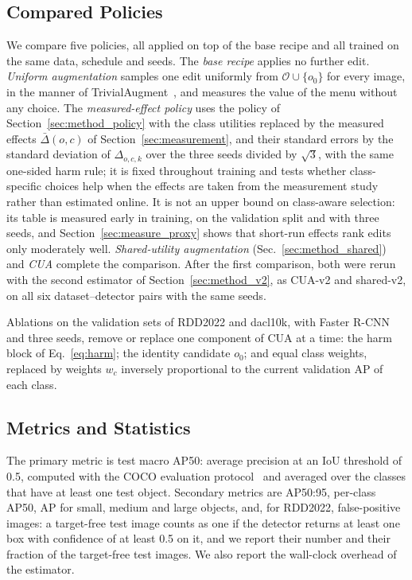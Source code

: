 \documentclass[conference]{IEEEtran}
\begin{document}
\subsection{Compared Policies}
\label{sec:setup_policies}

We compare five policies, all applied on top of the base recipe and all trained on the same data, schedule and seeds. The \emph{base recipe} applies no further edit. \emph{Uniform augmentation} samples one edit uniformly from $\mathcal{O}\cup\{o_0\}$ for every image, in the manner of TrivialAugment~\cite{muller2021trivial}, and measures the value of the menu without any choice. The \emph{measured-effect policy} uses the policy of Section~\ref{sec:method_policy} with the class utilities replaced by the measured effects $\bar\Delta(o,c)$ of Section~\ref{sec:measurement}, and their standard errors by the standard deviation of $\Delta_{o,c,k}$ over the three seeds divided by $\sqrt{3}$, with the same one-sided harm rule; it is fixed throughout training and tests whether class-specific choices help when the effects are taken from the measurement study rather than estimated online. It is not an upper bound on class-aware selection: its table is measured early in training, on the validation split and with three seeds, and Section~\ref{sec:measure_proxy} shows that short-run effects rank edits only moderately well. \emph{Shared-utility augmentation} (Sec.~\ref{sec:method_shared}) and \emph{CUA} complete the comparison. After the first comparison, both were rerun with the second estimator of Section~\ref{sec:method_v2}, as CUA-v2 and shared-v2, on all six dataset--detector pairs with the same seeds.

Ablations on the validation sets of RDD2022 and dacl10k, with Faster R-CNN and three seeds, remove or replace one component of CUA at a time: the harm block of Eq.~\eqref{eq:harm}; the identity candidate $o_0$; and equal class weights, replaced by weights $w_c$ inversely proportional to the current validation AP of each class.

\subsection{Metrics and Statistics}
\label{sec:setup_metrics}

The primary metric is test macro AP50: average precision at an IoU threshold of 0.5, computed with the COCO evaluation protocol~\cite{lin2014coco} and averaged over the classes that have at least one test object. Secondary metrics are AP50:95, per-class AP50, AP for small, medium and large objects, and, for RDD2022, false-positive images: a target-free test image counts as one if the detector returns at least one box with confidence of at least 0.5 on it, and we report their number and their fraction of the target-free test images. We also report the wall-clock overhead of the estimator.
\end{document}
